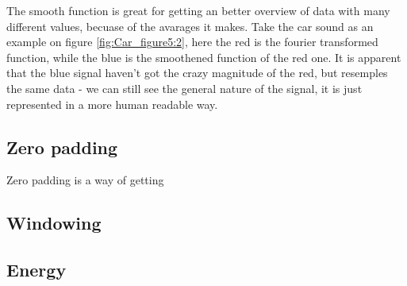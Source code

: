 The smooth function is great for getting an better overview of data with many different values, becuase of the avarages it makes. 
Take the car sound as an example on figure \ref{fig:Car_figure5:2}, here the red is the fourier transformed function, while the blue is the smoothened function of the red one. It is apparent that the blue signal haven't got the crazy magnitude of the red, but resemples the same data - we can still see the general nature of the signal, it is just represented in a more human readable way.

\subsection{Zero padding}

Zero padding is a way of getting 

\subsection{Windowing}

\subsection{Energy}